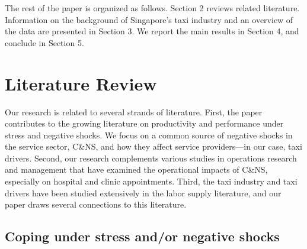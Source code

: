 \documentclass[reviewmode]{restud}
\begin{document}
The rest of the paper is organized as follows. Section 2 reviews related literature. Information on the background of Singapore's taxi industry and an overview of the data are presented in Section 3. We report the main results in Section 4, and conclude in Section 5.

\section{Literature Review}

Our research is related to several strands of literature. First, the paper contributes to the growing literature on productivity and performance under stress and negative shocks. We focus on a common source of negative shocks in the service sector, C\&NS, and how they affect service providers---in our case, taxi drivers. Second, our research complements various studies in operations research and management that have examined the operational impacts of C\&NS, especially on hospital and clinic appointments. Third, the taxi industry and taxi drivers  have been studied extensively in the labor supply literature, and our paper draws several connections to this literature.  


\subsection{Coping under stress and/or negative shocks}
\end{document}
